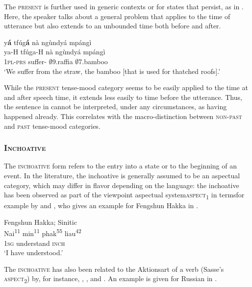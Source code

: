 The \textsc{present} is further used in generic contexts or for states that persist, as in . Here, the speaker talks about a general problem that applies to the time of utterance but also extends to an unbounded time both before and after.

\ea\label{presgen}
  \glll     y{\bfseries á} tfúg{\bfseries á} nà ngùndyá mpángì \\
            ya-H tfúga-H nà ngùndyá mpángì \\
              1\textsc{pl}-\textsc{prs} suffer-{\R} {\COM} $\emptyset$9.raffia $\emptyset$7.bamboo\\
    \trans `We suffer from the straw, the bamboo [that is used for thatched roofs].'
\z

While the \textsc{present} tense-mood category seems to be easily applied to the time at and after speech time, it extends less easily to time before the utterance. Thus, the sentence in  cannot be interpreted, under any circumstances, as having happened already. This correlates with the macro-distinction between \textsc{non-past} and \textsc{past} tense-mood categories.





\subsubsection{\textsc{Inchoative}} 
\label{sec:inch}


The \textsc{inchoative} form refers to the entry into a state or to the beginning of an event.
In the literature,  the inchoative is generally assumed to be an aspectual category, which may differ in flavor depending on the language:
the inchoative has been observed as part of the viewpoint aspectual system{\textemdash}\textsc{aspect}\textsubscript{1} in  terms{\textemdash}for example by \citet{melchert80} and \citet{wichaya2013}, who gives an example for Fengshun Hakka in .


\ea\label{Hakka} Fengshun Hakka; Sinitic \citep[50]{wichaya2013}\\
  \gll Nai\textsuperscript{11}  min\textsuperscript{11} phak\textsuperscript{55} liau\textsuperscript{42} \\
      1\textsc{sg} understand \textsc{inch} \\
\trans `I have understood.'
\z

\noindent The \textsc{inchoative} has also been related to the Aktionsart of a verb (Sasse's \textsc{aspect}\textsubscript{2}) by, for instance, \citet{botne83}, \citet{klein95}, and \citet{talmy2007}. An example is given for Russian in .

